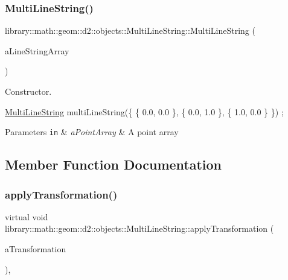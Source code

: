 \subsubsection{\texorpdfstring{Multi\+Line\+String()}{MultiLineString()}}
{\footnotesize\ttfamily library\+::math\+::geom\+::d2\+::objects\+::\+Multi\+Line\+String\+::\+Multi\+Line\+String (\begin{DoxyParamCaption}\item[{const Array$<$ \hyperlink{classlibrary_1_1math_1_1geom_1_1d2_1_1objects_1_1_line_string}{Line\+String} $>$ \&}]{a\+Line\+String\+Array }\end{DoxyParamCaption})}



Constructor. 


\begin{DoxyCode}
\hyperlink{classlibrary_1_1math_1_1geom_1_1d2_1_1objects_1_1_multi_line_string_a8fd6c575f0489484f99c94c607631303}{MultiLineString} multiLineString(\{ \{ 0.0, 0.0 \}, \{ 0.0, 1.0 \}, \{ 1.0, 0.0 \} \}) ;
\end{DoxyCode}



\begin{DoxyParams}[1]{Parameters}
\mbox{\tt in}  & {\em a\+Point\+Array} & A point array \\
\hline
\end{DoxyParams}


\subsection{Member Function Documentation}
\mbox{\label{classlibrary_1_1math_1_1geom_1_1d2_1_1objects_1_1_multi_line_string_a6180a8b94ff175d6313a74ad4e680bc7}} 
\subsubsection{\texorpdfstring{apply\+Transformation()}{applyTransformation()}}
{\footnotesize\ttfamily virtual void library\+::math\+::geom\+::d2\+::objects\+::\+Multi\+Line\+String\+::apply\+Transformation (\begin{DoxyParamCaption}\item[{const \hyperlink{classlibrary_1_1math_1_1geom_1_1d2_1_1_transformation}{Transformation} \&}]{a\+Transformation }\end{DoxyParamCaption})\hspace{0.3cm}{\ttfamily [override]}, {\ttfamily [virtual]}}



